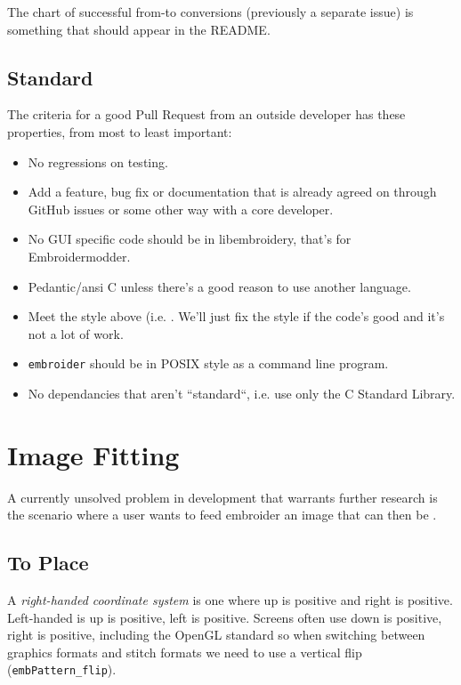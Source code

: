 \documentclass[10pt]{report}
\begin{document}
The chart of successful from-to conversions (previously a separate issue)
is something that should appear in the README.

\subsection{Standard}

The criteria for a good Pull Request from an outside developer has these properties, from most to least important:


\begin{itemize}
\item No regressions on testing.
\item Add a feature, bug fix or documentation that is already agreed on through
    GitHub issues or some other way with a core developer.
\item No GUI specific code should be in libembroidery, that's for Embroidermodder.
\item Pedantic/ansi C unless there's a good reason to use another language.
\item Meet the style above (i.e. \citep{pep7}.
    We'll just fix the style if the code's good and it's not a lot of work.
\item \texttt{embroider} should be in POSIX style as a command line program.
\item No dependancies that aren't ``standard``, i.e. use only the C Standard Library.
\end{itemize}

\section{Image Fitting}

A currently unsolved problem in development that warrants further research is
the scenario where a user wants to feed embroider an image that can then be .

\subsection{To Place}

A \emph{right-handed coordinate system}
is one where up is positive and right is
positive. Left-handed is up is positive, left is positive. Screens often use
down is positive, right is positive, including the OpenGL standard so when
switching between graphics formats and stitch formats we need to use a vertical
flip (\texttt{embPattern\_flip}).
\end{document}
